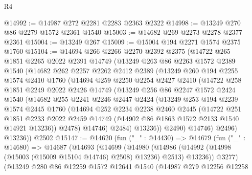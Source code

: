 \begin{lexlean}{R4}
\begin{coremodule}
@14992 := @14987 @272 @2281 @2283 @2363 @2322
@14998 := @13249 @270 @86 @2279 @1572 @2361 @1540
@15003 := @14682 @269 @2273 @2278 @2377 @2361
@15004 := @13249 @267
@15009 := @15004 @194 @2271 @1574 @2375 @1760
@15104 := @14694
    @266
    @2266
    @2270
    @2392
    @2375
    (@14722
      @265
      @1851
      @2265
      @2022
      @2391
      @14749
      (@13249
        @263
        @86
        @2263
        @1572
        @2389
        @1540
        (@14682
          @262
          @2257
          @2262
          @2412
          @2389
          (@13249
            @260
            @194
            @2255
            @1574
            @2410
            @1760
            (@14694
              @259
              @2250
              @2254
              @2427
              @2410
              (@14722
                @258
                @1851
                @2249
                @2022
                @2426
                @14749
                (@13249
                  @256
                  @86
                  @2247
                  @1572
                  @2424
                  @1540
                  (@14682
                    @255
                    @2241
                    @2246
                    @2447
                    @2424
                    (@13249
                      @253
                      @194
                      @2239
                      @1574
                      @2445
                      @1760
                      (@14694
                        @252
                        @2234
                        @2238
                        @2460
                        @2445
                        (@14722
                          @251
                          @1851
                          @2233
                          @2022
                          @2459
                          @14749
                          (@14902 @86 @1863 @1572 @2133 @1540 @14921 @13236))
                        @2478)
                      @14746)
                    @2484)
                  @13236))
              @2490)
            @14746)
          @2496)
        @13236))
    @2502
@15147 := @14620
    (fun ("_" : @14430) =>
    @14679
      (fun ("_" : @14680) =>
      @14687
        (@14693
          (@14699
            (@14980
              (@14986 (@14992 (@14998 (@15003 (@15009 @15104 @14746) @2508) @13236) @2513) @13236))
            @3277)
          (@13249
            @280
            @86
            @12259
            @1572
            @12641
            @1540
            (@14987
              @279
              @12256
              @12258

\end{coremodule}
\end{lexlean}
